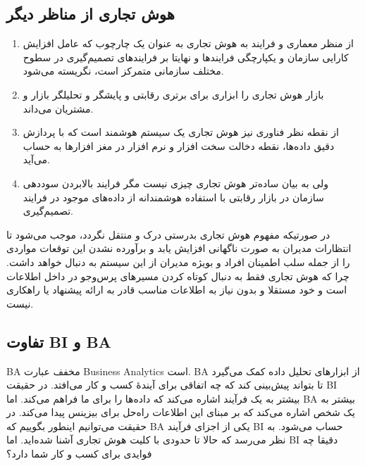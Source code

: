 \documentclass{llncs}
\begin{document}
\subsection{هوش تجاری از مناظر دیگر}
\begin{enumerate}
    \item از منظر معماری و فرایند به هوش تجاری به عنوان یک چارچوب که عامل افزایش کارایی سازمان و یکپارچگی فرایندها و نهایتا بر فرایندهای تصمیم‌گیری در سطوح مختلف سازمانی متمرکز است، نگریسته می‌شود.
    \item بازار هوش تجاری را ابزاری برای برتری رقابتی و پایشگر و تحلیلگر بازار و مشتریان می‌داند.
    \item از نقطه نظر فناوری نیز هوش تجاری یک سیستم هوشمند است که با پردازش دقیق داده‌ها، نقطه دخالت سخت افزار و نرم افزار در مغز افزارها به حساب می‌آید.
    \item ولی به بیان ساده‌تر هوش تجاری چیزی نیست مگر فرایند بالابردن سوددهی سازمان در بازار رقابتی با استفاده هوشمندانه از داده‌های موجود در فرایند تصمیم‌گیری.
\end{enumerate}
در صورتیکه مفهوم هوش تجاری بدرستی درک و منتقل نگردد، موجب می‌شود تا انتظارات مدیران به صورت ناگهانی افزایش یابد و برآورده نشدن این توقعات مواردی را از جمله سلب اطمینان افراد و بویژه مدیران از این سیستم به دنبال خواهد داشت. چرا که هوش تجاری فقط به دنبال کوتاه کردن مسیرهای پرس‌وجو در داخل اطلاعات است و خود مستقلا و بدون نیاز به اطلاعات مناسب قادر به ارائه پیشنهاد یا راهکاری نیست.

\subsection{تفاوت BI و BA}
BA مخفف عبارت Business Analytics است. BA از ابزارهای تحلیل داده کمک می‌گیرد تا بتواند پیش‌بینی کند که چه اتفاقی برای آیندۀ کسب و کار می‌افتد. در حقیقت BI بیشتر به یک فرآیند اشاره می‌کند که داده‌ها را برای ما فراهم می‌کند. اما BA بیشتر به یک شخص اشاره می‌کند که بر مبنای این اطلاعات راه‌حل برای بیزینس پیدا می‌کند. در حقیقت می‌توانیم اینطور بگوییم که BA یکی از اجزای فرآیند BI حساب می‌شود.
به نظر می‌رسد که حالا تا حدودی با کلیت هوش تجاری آشنا شده‌اید. اما BI دقیقا چه فوایدی برای کسب و کار شما دارد؟
\end{document}
